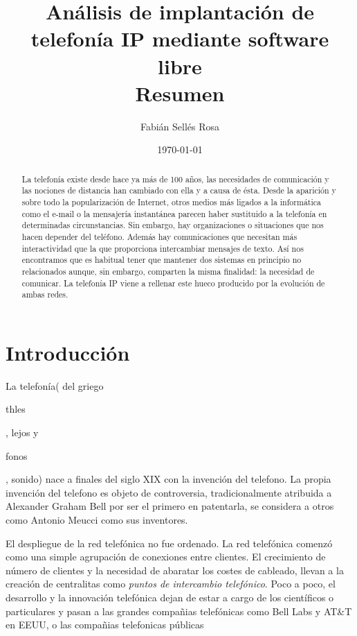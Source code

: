 \documentclass{scrartcl}
\title{Análisis de implantación de telefonía IP mediante software libre \\ Resumen}
\author{Fabián Sellés Rosa}
\date{\today}
\begin{document}
\maketitle

\begin{abstract}
  La telefonía existe desde hace ya más de 100 años, las necesidades de comunicación y las nociones de distancia han cambiado con ella y a causa de ésta. Desde la aparición y sobre todo la popularización de Internet, otros medios más ligados a la informática como el e-mail o la mensajería instantánea parecen haber sustituido a la telefonía en determinadas circunstancias. Sin embargo, hay organizaciones o situaciones que nos hacen depender del teléfono. Además hay comunicaciones que necesitan más interactividad que la que proporciona intercambiar mensajes de texto. Así nos encontramos que es habitual tener que mantener dos sistemas en principio no relacionados aunque, sin embargo, comparten la misma finalidad: la necesidad de comunicar. La telefonía IP viene a rellenar este hueco producido por la evolución de ambas redes. 
\end{abstract}

\section{Introducción}

La telefonía( del griego  
\begin{otherlanguage}{greek}
  thles
\end{otherlanguage}, lejos y 
\begin{otherlanguage}{greek}
  fonos
\end{otherlanguage}, sonido) nace a finales del siglo XIX con la invención del telefono. La propia invención del telefono es objeto de controversia, tradicionalmente atribuida a Alexander Graham Bell por ser el primero en patentarla, se considera a otros como Antonio Meucci como sus inventores.

El despliegue de la red telefónica no fue ordenado. La red telefónica comenzó como una simple agrupación de conexiones entre clientes. El crecimiento de número de clientes y la necesidad de abaratar los costes de cableado, llevan a la creación de centralitas como \emph{puntos de intercambio telefónico}. Poco a poco, el desarrollo y la innovación telefónica dejan de estar a cargo de los científicos o particulares y pasan a las grandes compañias telefónicas como Bell Labs y AT\&T en EEUU, o las compañias telefonicas públicas
\end{document}
